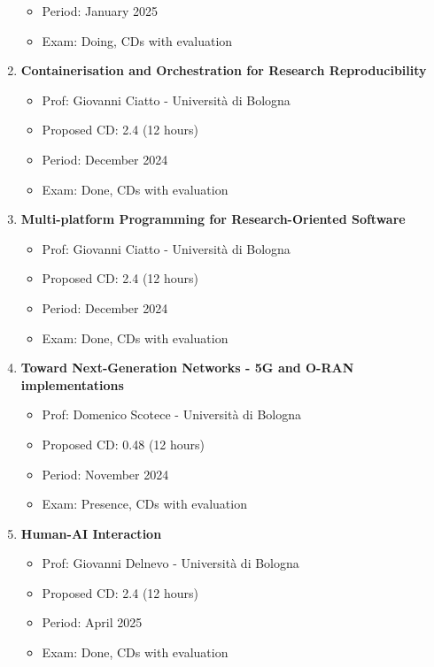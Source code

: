 \documentclass[runningheads]{llncs}
\begin{document}
\begin{enumerate}
\begin{itemize}
            \item Period: January 2025
            \item Exam: Doing, CDs with evaluation
        \end{itemize}
        \item \textbf{Containerisation and Orchestration for Research Reproducibility}
        \begin{itemize}
            \item Prof: Giovanni Ciatto - Università di Bologna
            \item Proposed CD: 2.4 (12 hours)
            \item Period: December 2024
            \item Exam: Done, CDs with evaluation
        \end{itemize}
        \item \textbf{Multi-platform Programming for Research-Oriented Software}
        \begin{itemize}
            \item Prof: Giovanni Ciatto - Università di Bologna
            \item Proposed CD: 2.4 (12 hours)
            \item Period: December 2024
            \item Exam: Done, CDs with evaluation
        \end{itemize}
        \item \textbf{Toward Next-Generation Networks - 5G and O-RAN implementations}
        \begin{itemize}
            \item Prof: Domenico Scotece - Università di Bologna
            \item Proposed CD: 0.48 (12 hours)
            \item Period: November 2024
            \item Exam: Presence, CDs with evaluation
        \end{itemize}
        \item \textbf{Human-AI Interaction}
        \begin{itemize}
            \item Prof: Giovanni Delnevo - Università di Bologna
            \item Proposed CD: 2.4 (12 hours)
            \item Period: April 2025
            \item Exam: Done, CDs with evaluation
        \end{itemize}

\end{enumerate}
\end{document}
